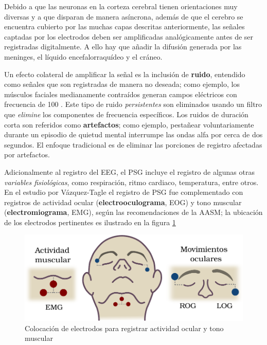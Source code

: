 Debido a que las neuronas en la corteza cerebral tienen orientaciones muy diversas y a que disparan 
de manera asíncrona, además de que el cerebro se encuentra cubierto por las muchas capas descritas
anteriormente, las señales captadas por los electrodos deben ser amplificadas analógicamente antes 
de ser registradas digitalmente.
A ello hay que añadir la difusión generada por las meninges, el líquido encefalorraquídeo y el 
cráneo.

%
%
Un efecto colateral de amplificar la señal es la inclusión de \textbf{ruido}, entendido como 
señales que son registradas de manera no deseada; como ejemplo, los músculos faciales medianamente 
contraídos generan campos eléctricos con frecuencia de 100 \hz.
Este tipo de ruido \textit{persistentes} son eliminados usando un filtro que \textit{elimine} los 
componentes de frecuencia específicos.
Los ruidos de duración corta son referidos como \textbf{artefactos}; como ejemplo,
pestañear voluntariamente durante un episodio de quietud mental interrumpe las ondas alfa por cerca 
de dos segundos. El enfoque tradicional es de eliminar las porciones de registro afectadas por 
artefactos.

Adicionalmente al registro del EEG, el PSG incluye el registro de algunas otras \textit{variables 
fisiológicas}, como respiración, ritmo cardiaco, temperatura, entre otros. En el estudio por 
Vázquez-Tagle el registro de PSG fue complementado con registros de actividad ocular 
(\textbf{electrooculograma}, EOG) y tono muscular (\textbf{electromiograma}, EMG), según las 
recomendaciones de la AASM; la ubicación de los electrodos pertinentes es ilustrado en la
figura \ref{emg_eog}

\begin{figure}
\centering
\includegraphics[width=\linewidth]
{./img_diagramas/emg_eog_v3.pdf}
\caption{Colocación de electrodos para registrar actividad ocular y tono muscular}
\label{emg_eog}
\end{figure}

